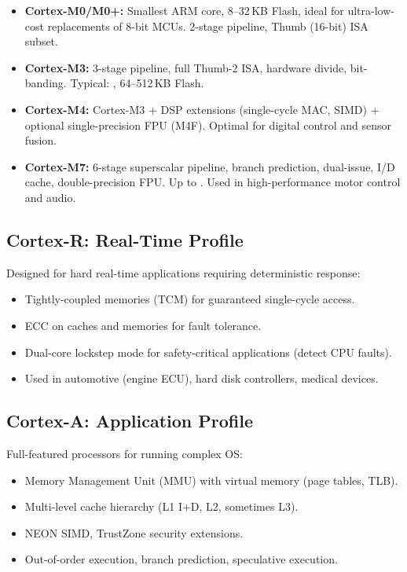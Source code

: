 \begin{itemize}
  \item \textbf{Cortex-M0/M0+:} Smallest ARM core, 8--32\,KB Flash, ideal for ultra-low-cost replacements of 8-bit MCUs. 2-stage pipeline, Thumb (16-bit) ISA subset.
  \item \textbf{Cortex-M3:} 3-stage pipeline, full Thumb-2 ISA, hardware divide, bit-banding. Typical: , 64--512\,KB Flash.
  \item \textbf{Cortex-M4:} Cortex-M3 + DSP extensions (single-cycle MAC, SIMD) + optional single-precision FPU (M4F). Optimal for digital control and sensor fusion.
  \item \textbf{Cortex-M7:} 6-stage superscalar pipeline, branch prediction, dual-issue, I/D cache, double-precision FPU. Up to . Used in high-performance motor control and audio.
\end{itemize}

\subsection{Cortex-R: Real-Time Profile}

Designed for hard real-time applications requiring deterministic response:
\begin{itemize}[nosep]
  \item Tightly-coupled memories (TCM) for guaranteed single-cycle access.
  \item ECC on caches and memories for fault tolerance.
  \item Dual-core lockstep mode for safety-critical applications (detect CPU faults).
  \item Used in automotive (engine ECU), hard disk controllers, medical devices.
\end{itemize}

\subsection{Cortex-A: Application Profile}

Full-featured processors for running complex OS:
\begin{itemize}[nosep]
  \item Memory Management Unit (MMU) with virtual memory (page tables, TLB).
  \item Multi-level cache hierarchy (L1 I+D, L2, sometimes L3).
  \item NEON SIMD, TrustZone security extensions.
  \item Out-of-order execution, branch prediction, speculative execution.
\end{itemize}

